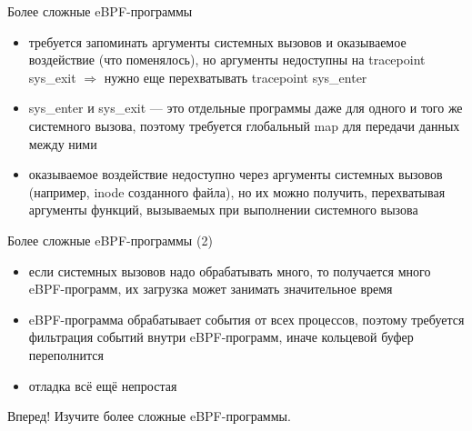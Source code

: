 \documentclass[hyperref={unicode=true}]{beamer}
\begin{document}
    \begin{frame}{Более сложные eBPF-программы}
    \begin{itemize}
    \item требуется запоминать аргументы системных вызовов
    и оказываемое воздействие (что поменялось), но аргументы
    недоступны на tracepoint sys\_exit $\Rightarrow$ нужно еще
    перехватывать tracepoint sys\_enter
    \item sys\_enter и sys\_exit --- это отдельные программы даже
    для одного и того же системного вызова, поэтому требуется
    глобальный map для передачи данных между ними
    \item оказываемое воздействие недоступно через аргументы
    системных вызовов (например, inode созданного файла), но
    их можно получить, перехватывая аргументы функций,
    вызываемых при выполнении системного вызова
    \end{itemize}
    \end{frame}

    \begin{frame}{Более сложные eBPF-программы (2)}
    \begin{itemize}
    \item если системных вызовов надо обрабатывать много, то
    получается много eBPF-программ, их загрузка может занимать
    значительное время
    \item eBPF-программа обрабатывает события от всех процессов,
    поэтому требуется фильтрация событий внутри eBPF-программ,
    иначе кольцевой буфер переполнится
    \item отладка всё ещё непростая
    \end{itemize}
    \end{frame}

    \begin{frame}{Вперед!}
    Изучите более сложные eBPF-программы.
    \end{frame}
\end{document}
